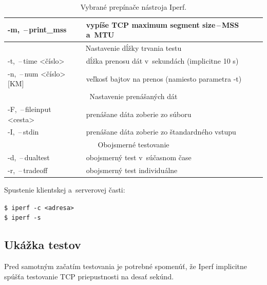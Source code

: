 \begin{table}[h!]
\begin{center}
\begin{tabular}{|l|p{9.2cm}|}
                    -m, \,--\,print\_mss  & vypíše TCP maximum segment
                        size\,--\,MSS a~MTU \\
                    \hline
                    \multicolumn{2}{|c|}{Nastavenie dĺžky trvania testu} \\
                    \hline
                    -t, \,--\,time \textless číslo\textgreater &
                        dĺžka prenosu dát v~sekundách (implicitne 10 s)\\
                    -n, \,--\,num \textless číslo\textgreater[KM] &
                        veľkosť bajtov na prenos (namiesto parametra -t)\\ 
                    \hline
                    \multicolumn{2}{|c|}{Nastavenie prenášaných dát} \\
                    \hline
                    -F, \,--\,fileinput \textless cesta\textgreater &
                    prenášane dáta zoberie zo súboru\\
                    -I, \,--\,stdin   &  prenášane dáta zoberie zo štandardného
                        vstupu\\
                    \hline
                    \multicolumn{2}{|c|}{Obojsmerné testovanie} \\
                    \hline
                    -d, \,--\,dualtest    &  obojsmerný test v~súčasnom čase\\ 
                    -r, \,--\,tradeoff    &  obojsmerný test individuálne \\
                    \hline
                \end{tabular}
                \caption{Vybrané prepínače nástroja Iperf.} 
                \label{tab_iperf_parametre}
            \end{center}
        \end{table}

        \newpage

        \noindent Spustenie klientskej a~serverovej časti:
        \begin{flushleft}
            \texttt{\$ iperf -c <adresa>} \\
            \texttt{\$ iperf -s} 
        \end{flushleft}

        \subsection{Ukážka testov} \label{iperf_testy}
        Pred samotným začatím testovania je potrebné spomenúť, že Iperf
        implicitne spúšťa testovanie TCP priepustnosti na desať sekúnd.

